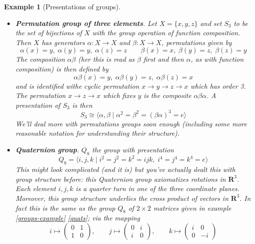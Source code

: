 \documentclass[12pt]{article}
\numberwithin{equation}{subsection}
\theoremstyle{note}
\newtheorem{example}[subsection]{Example}
\begin{document}
\begin{example}[Presentations of groups]
\begin{itemize}
	\item \textbf{Permutation group of three elements}. Let $X=\{x,y,z\}$ and set $S_3$ to be the set of bijections of $X$ with the group operation of function composition. Then $X$ has generators $\alpha\colon X\to X$ and $\beta \colon X\to X$, permutations given by \[ \alpha(x)=y,\; \alpha(y)=y,\;\alpha(z)=z \qquad \beta(x)=x,\; \beta(y)=z,\; \beta(z)=y\] The composition $\alpha \beta$ (her this is read as $\beta$ first and then $\alpha$, as with function composition) is then defined by \[\alpha\beta(x)=y,\; \alpha\beta(y)=z,\; \alpha\beta(z)=x\] and is identified withe cyclic permutation $x\to y\to z\to x$ which has order 3. The permutation $x\to z\to x$ which fixes $y$ is the composite $\alpha\beta\alpha$.
	A presentation of $S_3$ is then \begin{equation}S_3\cong \langle \alpha,\beta \mid \alpha^2=\beta^2=(\beta\alpha)^3=e\rangle\end{equation}
	We'll deal more with permutations groups soon enough (including some more reasonable notation for understanding their structure).
	\item \textbf{Quaternion group}. $Q_8$ the group with presentation \begin{equation} \label{Q_8} Q_8=\langle i,j,k \mid i^2=j^2=k^2=ijk, \;i^4=j^4=k^4=e\rangle\end{equation}
	This might look complicated (and it is) but you've actually dealt this with group structure before: this Quaternion group axiomatizes rotations in $\mathbf{R}^3$. Each element $i,j,k$ is a quarter turn in one of the three coordinate planes. Moreover, this group structure underlies the \textit{cross product} of vectors in $\mathbf{R}^3$. In fact this is the same as the group $Q_8$ of $2\times 2$ matrices given in example \ref{groups-example} \ref{quats}; via the mapping \[i\mapsto \begin{pmatrix} 0 & 1 \\ 1 & 0 \end{pmatrix}, \qquad j\mapsto \begin{pmatrix} 0 & i \\ i & 0\end{pmatrix}, \qquad k\mapsto \begin{pmatrix} i & 0 \\ 0 & -i \end{pmatrix}\]
	
\end{itemize}
\end{example}
\end{document}
